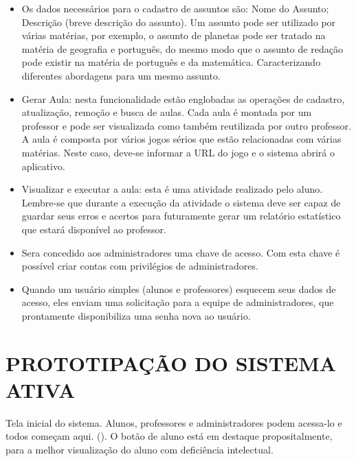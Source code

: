 \documentclass{utfpr-pg}
\begin{document}
\begin{itemize}
    \item Os dados necessários para o cadastro de assuntos são: Nome do Assunto; Descrição (breve descrição do assunto). Um assunto pode ser utilizado por várias matérias, por exemplo, o assunto de planetas pode ser tratado na matéria de geografia e português, do mesmo modo que o assunto de redação pode existir na matéria de português e da matemática. Caracterizando diferentes abordagens para um mesmo assunto.
    
    \item Gerar Aula: nesta funcionalidade estão englobadas as operações de cadastro, atualização, remoção e busca de aulas. Cada aula é montada por um professor e pode ser visualizada como também reutilizada por outro professor. A aula é composta por vários jogos sérios que estão relacionadas com várias matérias. Neste caso, deve-se informar a URL do jogo e o sistema abrirá o aplicativo. 
    
    \item Visualizar e executar a aula: esta é uma atividade realizado pelo aluno. Lembre-se que durante a execução da atividade o sistema deve ser capaz de guardar seus erros e acertos para futuramente gerar um relatório estatístico que estará disponível ao professor.
    
    \item Sera concedido aos administradores uma chave de acesso. Com esta chave é possível criar contas com privilégios de administradores.
    
    \item Quando um usuário simples (alunos e professores) esquecem seus dados de acesso, eles enviam uma solicitação para a equipe de administradores, que prontamente disponibiliza uma senha nova ao usuário.
    
\end{itemize}

\chapter{PROTOTIPAÇÃO DO SISTEMA ATIVA}
    \label{chapter:prototipacao do sitema ativa}
        Tela inicial do sistema. Alunos, professores e administradores podem acessa-lo e todos começam aqui. (). O botão de aluno está em destaque propositalmente, para a melhor visualização do aluno com deficiência intelectual.
       
\end{document}
